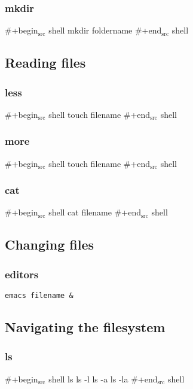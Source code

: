 \documentclass[11pt]{article}
\begin{document}
\subsubsection{mkdir}
\label{sec:orgheadline19}
\#+begin\(_{\text{src}}\) shell
mkdir foldername
\#+end\(_{\text{src}}\) shell


\subsection{Reading files}
\label{sec:orgheadline24}

\subsubsection{less}
\label{sec:orgheadline21}
\#+begin\(_{\text{src}}\) shell
touch filename
\#+end\(_{\text{src}}\) shell

\subsubsection{more}
\label{sec:orgheadline22}
\#+begin\(_{\text{src}}\) shell
touch filename
\#+end\(_{\text{src}}\) shell

\subsubsection{cat}
\label{sec:orgheadline23}
\#+begin\(_{\text{src}}\) shell
cat filename
\#+end\(_{\text{src}}\) shell


\subsection{Changing files}
\label{sec:orgheadline26}

\subsubsection{editors}
\label{sec:orgheadline25}
\begin{verbatim}
emacs filename &
\end{verbatim}


\subsection{Navigating the filesystem}
\label{sec:orgheadline30}

\subsubsection{ls}
\label{sec:orgheadline27}
\#+begin\(_{\text{src}}\) shell
ls
ls -l
ls -a
ls -la
\#+end\(_{\text{src}}\) shell
\end{document}
